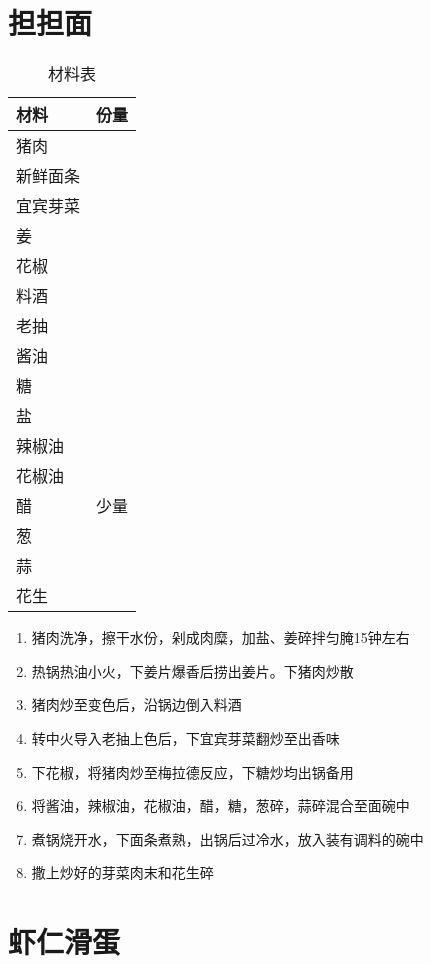 \section{担担面}

\begin{table}[H]
    \centering
    \begin{tabular}{|l||c|}\hline
     \textbf{材料}    &  \textbf{份量}\\ \hline\hline
    猪肉   &   \\ \hline
    新鲜面条 & \\ \hline
    宜宾芽菜    &   \\ \hline
    姜 &  \\ \hline 
    花椒 & \\ \hline
    料酒 &  \\ \hline
    老抽 & \\ \hline 
    酱油 & \\ \hline
    糖 & \\ \hline 
    盐 & \\ \hline
    辣椒油 & \\ \hline
    花椒油 & \\ \hline
    醋 & 少量\\ \hline
    葱 & \\ \hline
    蒜 & \\ \hline
    花生 & \\ \hline
    \end{tabular}
    \caption{材料表}
\end{table}

\begin{enumerate}
    \item 猪肉洗净，擦干水份，剁成肉糜，加盐、姜碎拌匀腌15钟左右
    \item 热锅热油小火，下姜片爆香后捞出姜片。下猪肉炒散
    \item 猪肉炒至变色后，沿锅边倒入料酒
    \item 转中火导入老抽上色后，下宜宾芽菜翻炒至出香味
    \item 下花椒，将猪肉炒至梅拉德反应，下糖炒均出锅备用
    \item 将酱油，辣椒油，花椒油，醋，糖，葱碎，蒜碎混合至面碗中
    \item 煮锅烧开水，下面条煮熟，出锅后过冷水，放入装有调料的碗中
    \item 撒上炒好的芽菜肉末和花生碎
\end{enumerate}



\section{虾仁滑蛋}

